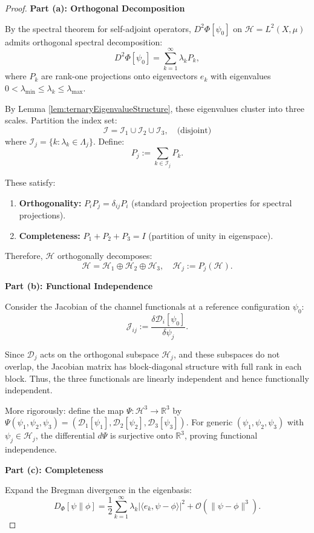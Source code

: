 \begin{definition}
\begin{lemma}
\begin{proof}
\textbf{Part (a): Orthogonal Decomposition}

By the spectral theorem for self-adjoint operators, $D^2\Phi[\psi_0]$ on $\mathcal{H} = L^2(X, \mu)$ admits orthogonal spectral decomposition:
\[
D^2\Phi[\psi_0] = \sum_{k=1}^\infty \lambda_k P_k,
\]
where $P_k$ are rank-one projections onto eigenvectors $e_k$ with eigenvalues $0 < \lambda_{\min} \leq \lambda_k \leq \lambda_{\max}$.

By Lemma \ref{lem:ternaryEigenvalueStructure}, these eigenvalues cluster into three scales. Partition the index set:
\[
\mathcal{I} = \mathcal{I}_1 \cup \mathcal{I}_2 \cup \mathcal{I}_3, \quad \text{(disjoint)}
\]
where $\mathcal{I}_j = \{k : \lambda_k \in \Lambda_j\}$. Define:
\[
P_j := \sum_{k \in \mathcal{I}_j} P_k.
\]

These satisfy:
\begin{enumerate}
\item \textbf{Orthogonality:} $P_i P_j = \delta_{ij} P_i$ (standard projection properties for spectral projections).
\item \textbf{Completeness:} $P_1 + P_2 + P_3 = I$ (partition of unity in eigenspace).
\end{enumerate}

Therefore, $\mathcal{H}$ orthogonally decomposes:
\[
\mathcal{H} = \mathcal{H}_1 \oplus \mathcal{H}_2 \oplus \mathcal{H}_3, \quad \mathcal{H}_j := P_j(\mathcal{H}).
\]

\textbf{Part (b): Functional Independence}

Consider the Jacobian of the channel functionals at a reference configuration $\psi_0$:
\[
\mathcal{J}_{ij} := \frac{\delta \mathcal{D}_i[\psi_0]}{\delta \psi_j}.
\]

Since $\mathcal{D}_j$ acts on the orthogonal subspace $\mathcal{H}_j$, and these subspaces do not overlap, the Jacobian matrix has block-diagonal structure with full rank in each block. Thus, the three functionals are linearly independent and hence functionally independent.

More rigorously: define the map $\Psi: \mathcal{H}^3 \to \mathbb{R}^3$ by $\Psi(\psi_1, \psi_2, \psi_3) = (\mathcal{D}_1[\psi_1], \mathcal{D}_2[\psi_2], \mathcal{D}_3[\psi_3])$. For generic $(\psi_1, \psi_2, \psi_3)$ with $\psi_j \in \mathcal{H}_j$, the differential $d\Psi$ is surjective onto $\mathbb{R}^3$, proving functional independence.

\textbf{Part (c): Completeness}

Expand the Bregman divergence in the eigenbasis:
\[
D_{\Phi}[\psi \| \phi] = \frac{1}{2} \sum_{k=1}^\infty \lambda_k |\langle e_k, \psi - \phi \rangle|^2 + \mathcal{O}(\|\psi - \phi\|^3).
\]


\end{proof}
\end{lemma}
\end{definition}
